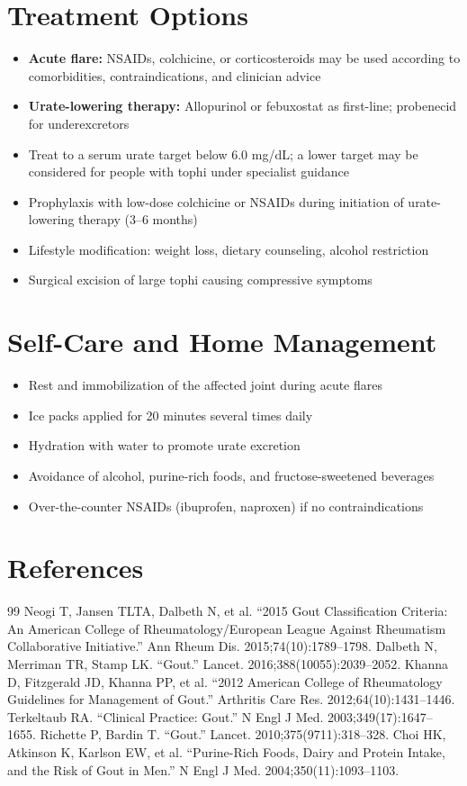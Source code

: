 \section*{Treatment Options}
\begin{itemize}
  \item \textbf{Acute flare:} NSAIDs, colchicine, or corticosteroids may be used according to comorbidities, contraindications, and clinician advice
  \item \textbf{Urate-lowering therapy:} Allopurinol or febuxostat as first-line; probenecid for underexcretors
  \item Treat to a serum urate target below 6.0 mg/dL; a lower target may be considered for people with tophi under specialist guidance
  \item Prophylaxis with low-dose colchicine or NSAIDs during initiation of urate-lowering therapy (3--6 months)
  \item Lifestyle modification: weight loss, dietary counseling, alcohol restriction
  \item Surgical excision of large tophi causing compressive symptoms
\end{itemize}

\section*{Self-Care and Home Management}
\begin{itemize}
  \item Rest and immobilization of the affected joint during acute flares
  \item Ice packs applied for 20 minutes several times daily
  \item Hydration with water to promote urate excretion
  \item Avoidance of alcohol, purine-rich foods, and fructose-sweetened beverages
  \item Over-the-counter NSAIDs (ibuprofen, naproxen) if no contraindications
\end{itemize}

\section*{References}
\begin{thebibliography}{99}
 Neogi T, Jansen TLTA, Dalbeth N, et al. ``2015 Gout Classification Criteria: An American College of Rheumatology/European League Against Rheumatism Collaborative Initiative.'' Ann Rheum Dis. 2015;74(10):1789--1798.
 Dalbeth N, Merriman TR, Stamp LK. ``Gout.'' Lancet. 2016;388(10055):2039--2052.
 Khanna D, Fitzgerald JD, Khanna PP, et al. ``2012 American College of Rheumatology Guidelines for Management of Gout.'' Arthritis Care Res. 2012;64(10):1431--1446.
 Terkeltaub RA. ``Clinical Practice: Gout.'' N Engl J Med. 2003;349(17):1647--1655.
 Richette P, Bardin T. ``Gout.'' Lancet. 2010;375(9711):318--328.
 Choi HK, Atkinson K, Karlson EW, et al. ``Purine-Rich Foods, Dairy and Protein Intake, and the Risk of Gout in Men.'' N Engl J Med. 2004;350(11):1093--1103.
\end{thebibliography}
